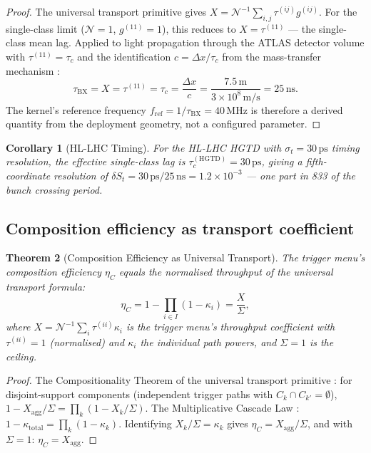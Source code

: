 \documentclass[twocolumn,10pt,a4paper]{article}
\theoremstyle{thmstyle}
\newtheorem{theorem}{Theorem}[section]
\newtheorem{corollary}[theorem]{Corollary}
\theoremstyle{definition}
\theoremstyle{remark}
\newcommand{\tBX}{\tau_{\mathrm{BX}}}
\newcommand{\etaC}{\eta_{C}}
\newcommand{\TP}{X}
\newcommand{\lag}{\tau}
\newcommand{\cpl}{g}
\newcommand{\catpow}{\kappa}
\begin{document}
\begin{proof}
The universal transport primitive \citep{companion:transport} gives
$\TP = \mathcal{N}^{-1}\sum_{i,j}\lag^{(ij)}\cpl^{(ij)}$. For the
single-class limit ($\mathcal{N} = 1$, $\cpl^{(11)} = 1$), this reduces
to $\TP = \lag^{(11)}$ — the single-class mean lag. Applied to light
propagation through the ATLAS detector volume with $\lag^{(11)} = \tau_c$
and the identification $c = \Delta x / \tau_c$ from the mass-transfer
mechanism \citep{companion:spectrometer}:
\[
\tBX = \TP = \lag^{(11)} = \tau_c = \frac{\Delta x}{c} = \frac{7.5\,\mathrm{m}}{3\times10^8\,\mathrm{m/s}} = 25\,\mathrm{ns}.
\]
The kernel's reference frequency $f_{\mathrm{ref}} = 1/\tBX = 40\,\mathrm{MHz}$
is therefore a derived quantity from the deployment geometry,
not a configured parameter.
\end{proof}

\begin{corollary}[HL-LHC Timing]
For the HL-LHC HGTD with $\sigma_t = 30\,\mathrm{ps}$ timing resolution,
the effective single-class lag is $\tau_c^{(\mathrm{HGTD})} = 30\,\mathrm{ps}$,
giving a fifth-coordinate resolution of $\delta S_t = 30\,\mathrm{ps}/25\,\mathrm{ns}
= 1.2\times10^{-3}$ — one part in 833 of the bunch crossing period.
\end{corollary}

\subsection{Composition efficiency as transport coefficient}

\begin{theorem}[Composition Efficiency as Universal Transport]
\label{thm:eta_transport}
The trigger menu's composition efficiency $\etaC$ equals the normalised
throughput of the universal transport formula:
\begin{equation}
\etaC = 1 - \prod_{i \in I}(1-\catpow_i) = \frac{\TP}{\Sigma},
\label{eq:eta_transport}
\end{equation}
where $\TP = \mathcal{N}^{-1}\sum_i \lag^{(ii)}\catpow_i$ is the trigger
menu's throughput coefficient with $\lag^{(ii)} = 1$ (normalised) and
$\catpow_i$ the individual path powers, and $\Sigma = 1$ is the ceiling.
\end{theorem}

\begin{proof}
The Compositionality Theorem of the universal transport primitive
\citep{companion:transport}: for disjoint-support components (independent
trigger paths with $C_k \cap C_{k'} = \emptyset$),
$1 - \TP_{\mathrm{agg}}/\Sigma = \prod_k(1 - \TP_k/\Sigma)$.
The Multiplicative Cascade Law \citep{companion:cascade}:
$1 - \catpow_{\mathrm{total}} = \prod_k(1-\catpow_k)$.
Identifying $\TP_k/\Sigma = \catpow_k$ gives $\etaC = \TP_{\mathrm{agg}}/\Sigma$,
and with $\Sigma = 1$: $\etaC = \TP_{\mathrm{agg}}$.
\end{proof}
\end{document}
